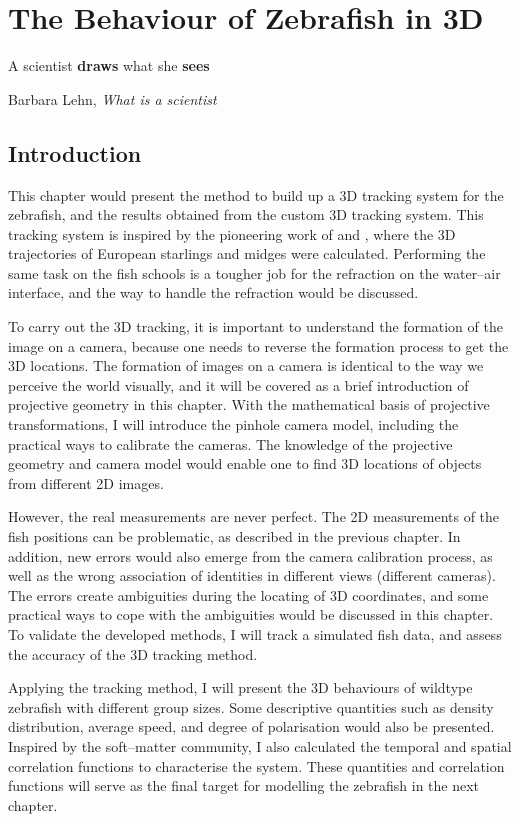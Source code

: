 \documentclass[11pt,twoside]{report}
\begin{document}
\chapter{The Behaviour of Zebrafish in 3D}
\label{chapter:fish_3d}

\epigraph{
A scientist \textbf{draws} what she \textbf{sees}
}{Barbara Lehn, \emph{What is a scientist}}

\section{Introduction}

This chapter would present the method to build up a 3D tracking system for the zebrafish, and the results obtained from the custom 3D tracking system. This tracking system is inspired by the pioneering work of \citeauthor{cavagna2008} \cite{cavagna2008} and \citeauthor{kelley2013} \cite{kelley2013}, where the 3D trajectories of European starlings and midges were calculated. Performing the same task on the fish schools is a tougher job for the refraction on the water--air interface, and the way to handle the refraction would be discussed.

To carry out the 3D tracking, it is important to understand the formation of the image on a camera, because one needs to reverse the formation process to get the 3D locations. The formation of images on a camera is identical to the way we perceive the world visually, and it will be covered as a brief introduction of projective geometry in this chapter. With the mathematical basis of projective transformations, I will introduce the pinhole camera model, including the practical ways to calibrate the cameras. The knowledge of the projective geometry and camera model would enable one to find 3D locations of objects from different 2D images.

However, the real measurements are never perfect. The 2D measurements of the fish positions can be problematic, as described in the previous chapter. In addition, new errors would also emerge from the camera calibration process, as well as the wrong association of identities in different views (different cameras). The errors create ambiguities during the locating of 3D coordinates, and some practical ways to cope with the ambiguities would be discussed in this chapter. To validate the developed methods, I will track a simulated fish data, and assess the accuracy of the 3D tracking method.

Applying the tracking method, I will present the 3D behaviours of wildtype zebrafish with different group sizes. Some descriptive quantities such as density distribution, average speed, and degree of polarisation would also be presented. Inspired by the soft--matter community, I also calculated the temporal and spatial correlation functions to characterise the system. These quantities and correlation functions will serve as the final target for modelling the zebrafish in the next chapter.
\end{document}
